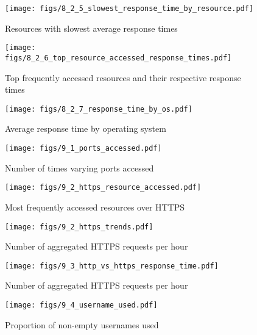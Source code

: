 \documentclass[12pt,titlepage]{article}
\begin{document}
\begin{figure}[thbp]
  \centering
  \texttt{[image: figs/8\_2\_5\_slowest\_response\_time\_by\_resource.pdf]}
  \caption{Resources with slowest average response times}
  \label{fig:8_2_5_slowest_response_time_by_resource}
\end{figure}

\begin{figure}[thbp]
  \centering
  \texttt{[image: figs/8\_2\_6\_top\_resource\_accessed\_response\_times.pdf]}
  \caption{Top frequently accessed resources and their respective response times}
  \label{fig:8_2_6_top_resource_accessed_response_times}
\end{figure}

\begin{figure}[thbp]
  \centering
  \texttt{[image: figs/8\_2\_7\_response\_time\_by\_os.pdf]}
  \caption{Average response time by operating system}
  \label{fig:8_2_7_response_time_by_os}
\end{figure}

\begin{figure}[thbp]
  \centering
  \texttt{[image: figs/9\_1\_ports\_accessed.pdf]}
  \caption{Number of times varying ports accessed}
  \label{fig:9_1_ports_accessed}
\end{figure}

\begin{figure}[thbp]
  \centering
  \texttt{[image: figs/9\_2\_https\_resource\_accessed.pdf]}
  \caption{Most frequently accessed resources over HTTPS}
  \label{fig:9_2_https_resource_accessed}
\end{figure}

\begin{figure}[thbp]
  \centering
  \texttt{[image: figs/9\_2\_https\_trends.pdf]}
  \caption{Number of aggregated HTTPS requests per hour}
  \label{fig:9_2_https_trends}
\end{figure}

\begin{figure}[thbp]
  \centering
  \texttt{[image: figs/9\_3\_http\_vs\_https\_response\_time.pdf]}
  \caption{Number of aggregated HTTPS requests per hour}
  \label{fig:9_3_http_vs_https_response_time}
\end{figure}

\begin{figure}[thbp]
  \centering
  \texttt{[image: figs/9\_4\_username\_used.pdf]}
  \caption{Proportion of non-empty usernames used}
  \label{fig:9_4_username_used}
\end{figure}
\end{document}
